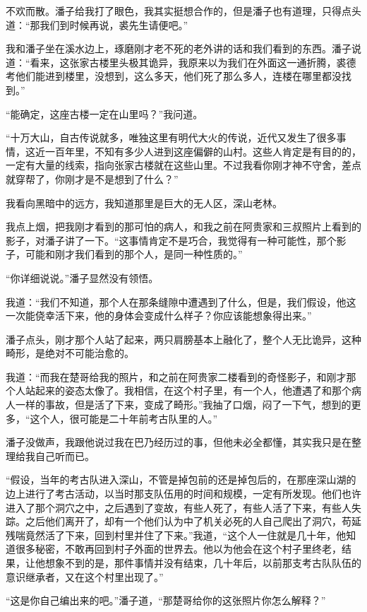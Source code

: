 不欢而散。潘子给我打了眼色，我其实挺想合作的，但是潘子也有道理，只得点头道：“那我们到时候再说，裘先生请便吧。”

我和潘子坐在溪水边上，琢磨刚才老不死的老外讲的话和我们看到的东西。潘子说道：“看来，这张家古楼里头极其诡异，我原来以为我们在外面这一通折腾，裘德考他们能进到楼里，没想到，这么多天，他们死了那么多人，连楼在哪里都没找到。”

“能确定，这座古楼一定在山里吗？”我问道。

“十万大山，自古传说就多，唯独这里有明代大火的传说，近代又发生了很多事情，这近一百年里，不知有多少人进到这座偏僻的山村。这些人肯定是有目的的，一定有大量的线索，指向张家古楼就在这些山里。不过我看你刚才神不守舍，差点就穿帮了，你刚才是不是想到了什么？”

我看向黑暗中的远方，我知道那里是巨大的无人区，深山老林。

我点上烟，把我刚才看到的那可怕的病人，和我之前在阿贵家和三叔照片上看到的影子，对潘子讲了一下。“这事情肯定不是巧合，我觉得有一种可能性，那个影子，可能和刚才我们看到的那个人，是同一种性质的。”

“你详细说说。”潘子显然没有领悟。

我道：“我们不知道，那个人在那条缝隙中遭遇到了什么，但是，我们假设，他这一次能侥幸活下来，他的身体会变成什么样子？你应该能想象得出来。”

潘子点头，刚才那个人站了起来，两只肩膀基本上融化了，整个人无比诡异，这种畸形，是绝对不可能治愈的。

我道：“而我在楚哥给我的照片，和之前在阿贵家二楼看到的奇怪影子，和刚才那个人站起来的姿态太像了。我相信，在这个村子里，有一个人，他遭遇了和那个病人一样的事故，但是活了下来，变成了畸形。”我抽了口烟，闷了一下气，想到的更多，“这个人，很可能是二十年前考古队里的人。”

潘子没做声，我跟他说过我在巴乃经历过的事，但他未必全都懂，其实我只是在整理给我自己听而已。

“假设，当年的考古队进入深山，不管是掉包前的还是掉包后的，在那座深山湖的边上进行了考古活动，以当时那支队伍用的时间和规模，一定有所发现。他们也许进入了那个洞穴之中，之后遇到了变故，有些人死了，有些人活了下来，有些人失踪。之后他们离开了，却有一个他们认为中了机关必死的人自己爬出了洞穴，苟延残喘竟然活了下来，回到村里并住了下来。”我道，“这个人一住就是几十年，他知道很多秘密，不敢再回到村子外面的世界去。他以为他会在这个村子里终老，结果，让他想象不到的是，那件事情并没有结束，几十年后，以前那支考古队队伍的意识继承者，又在这个村里出现了。”

“这是你自己编出来的吧。”潘子道，“那楚哥给你的这张照片你怎么解释？”

